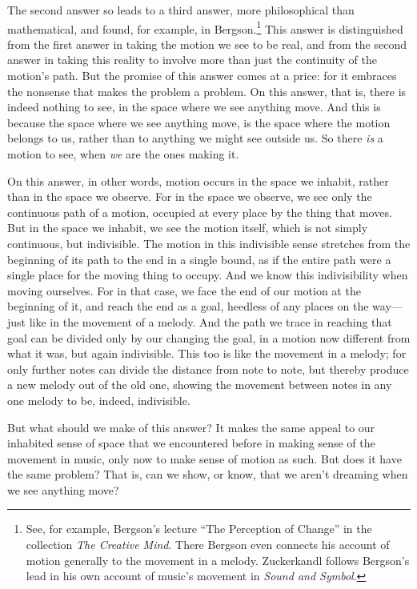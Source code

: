 \documentclass[12pt]{memoir}
\begin{document}
The second answer so leads to a third answer, more
philosophical than mathematical, and found, for
example, in Bergson.\footnote{See, for example,
Bergson's lecture ``The Perception of Change'' in
the collection \emph{The Creative Mind}. There
Bergson even connects his account of motion
generally to the movement in a melody. Zuckerkandl
follows Bergson's lead in his own account of
music's movement in \emph{Sound and Symbol}.} This
answer is distinguished from the first answer in
taking the motion we see to be real, and from the
second answer in taking this reality to involve
more than just the continuity of the motion's
path. But the promise of this answer comes at a
price: for it embraces the nonsense that makes the
problem a problem. On this answer, that is, there
is indeed nothing to see, in the space where we
see anything move. And this is because the space
where we see anything move, is the space where the
motion belongs to us, rather than to anything we
might see outside us. So there \emph{is} a motion
to see, when \emph{we} are the ones making it.

On this answer, in other words, motion occurs in
the space we inhabit, rather than in the space
we observe. For in the space we observe, we see
only the continuous path of a motion, occupied
at every place by the thing that moves. But in
the space we inhabit, we see the motion itself,
which is not simply continuous, but indivisible.
The motion in this indivisible sense stretches
from the beginning of its path to the end in a
single bound, as if the entire path were a single
place for the moving thing to occupy. And we know
this indivisibility when moving ourselves. For
in that case, we face the end of our motion at
the beginning of it, and reach the end as a goal,
heedless of any places on the way---just like in
the movement of a melody. And the path we trace
in reaching that goal can be divided only by our
changing the goal, in a motion now different from
what it was, but again indivisible. This too is
like the movement in a melody; for only further
notes can divide the distance from note to note,
but thereby produce a new melody out of the old
one, showing the movement between notes in any one
melody to be, indeed, indivisible.

But what should we make of this answer? It makes
the same appeal to our inhabited sense of space
that we encountered before in making sense of
the movement in music, only now to make sense of
motion as such. But does it have the same problem?
That is, can we show, or know, that we aren't
dreaming when we see anything move?
\end{document}
